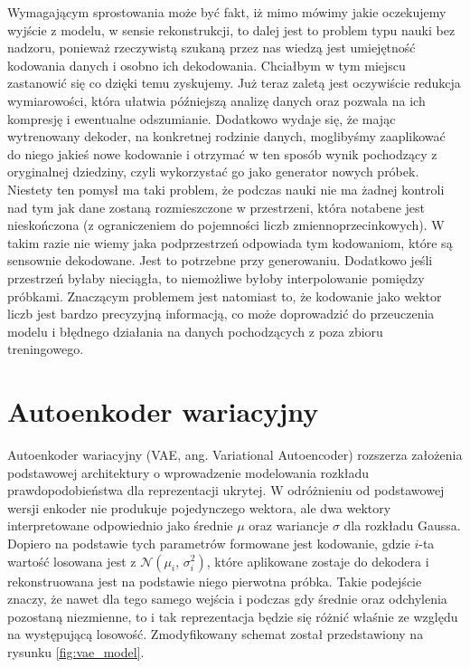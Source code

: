 Wymagającym sprostowania może być fakt, iż mimo mówimy jakie oczekujemy wyjście z modelu, w sensie rekonstrukcji, to dalej jest to problem typu nauki bez nadzoru, ponieważ rzeczywistą szukaną przez nas wiedzą jest umiejętność kodowania danych i osobno ich dekodowania. Chciałbym w tym miejscu zastanowić się co dzięki temu zyskujemy. Już teraz zaletą jest oczywiście redukcja wymiarowości, która ułatwia późniejszą analizę danych oraz pozwala na ich kompresję i ewentualne odszumianie. Dodatkowo wydaje się, że mając wytrenowany dekoder, na konkretnej rodzinie danych, moglibyśmy zaaplikować do niego jakieś nowe kodowanie i otrzymać w ten sposób wynik pochodzący z oryginalnej dziedziny, czyli wykorzystać go jako generator nowych próbek. Niestety ten pomysł ma taki problem, że podczas nauki nie ma żadnej kontroli nad tym jak dane zostaną rozmieszczone w przestrzeni, która notabene jest nieskończona (z ograniczeniem do pojemności liczb zmiennoprzecinkowych). W takim razie nie wiemy jaka podprzestrzeń odpowiada tym kodowaniom, które są sensownie dekodowane. Jest to potrzebne przy generowaniu. Dodatkowo jeśli przestrzeń byłaby nieciągła, to niemożliwe byłoby interpolowanie pomiędzy próbkami. Znaczącym problemem jest natomiast to, że kodowanie jako wektor liczb jest bardzo precyzyjną informacją, co może doprowadzić do przeuczenia modelu i błędnego działania na danych pochodzących z poza zbioru treningowego.

\section{Autoenkoder wariacyjny} \label{sec:vae}

Autoenkoder wariacyjny (VAE, ang. Variational Autoencoder) rozszerza założenia podstawowej architektury o wprowadzenie modelowania rozkładu prawdopodobieństwa dla reprezentacji ukrytej. W odróżnieniu od podstawowej wersji enkoder nie produkuje pojedynczego wektora, ale dwa wektory interpretowane odpowiednio jako średnie $\mu$ oraz wariancje $\sigma$ dla rozkładu Gaussa. Dopiero na podstawie tych parametrów formowane jest kodowanie, gdzie $i$-ta wartość losowana jest z $\mathcal{N}(\mu_{i},\,\sigma_{i}^{2})$, które aplikowane zostaje do dekodera i rekonstruowana jest na podstawie niego pierwotna próbka. Takie podejście znaczy, że nawet dla tego samego wejścia i podczas gdy średnie oraz odchylenia pozostaną niezmienne, to i tak reprezentacja będzie się różnić właśnie ze względu na występującą losowość. Zmodyfikowany schemat został przedstawiony na rysunku \ref{fig:vae_model}.


